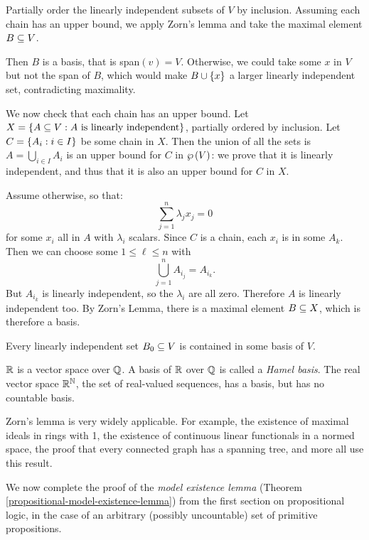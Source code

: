 \documentclass{article}
\begin{document}
\begin{prf}
    Partially order the linearly independent subsets of $V$ by inclusion. Assuming each chain has an upper bound, we apply Zorn's lemma and take the maximal element $B \subseteq V$.
    
    Then $B$ is a basis, that is span$(v) = V$. Otherwise, we could take some $x$ in $V$ but not the span of $B$, which would make $B \cup \left\lbrace x \right\rbrace$ a larger linearly independent set, contradicting maximality.
    
    We now check that each chain has an upper bound. Let $X = \left\lbrace A \subseteq V : A \text{ is linearly independent} \right\rbrace$, partially ordered by inclusion. Let $C = \left\lbrace A_i : i \in I \right\rbrace$ be some chain in $X$. Then the union of all the sets is $A = \bigcup_{i \in I} A_i$ is an upper bound for $C$ in $\wp\left(V\right)$: we prove that it is linearly independent, and thus that it is also an upper bound for $C$ in $X$.
    
    Assume otherwise, so that:
    \[
	\sum_{j=1}^n \lambda_j x_j = 0
	\]
	for some $x_i$ all in $A$ with $\lambda_i$ scalars. Since $C$ is a chain, each $x_i$ is in some $A_k$. Then we can choose some $1 \leq \ell \leq n$ with
	\[
	\bigcup_{j=1}^n A_{i_j} = A_{i_k}.
	\]
	But $A_{i_k}$ is linearly independent, so the $\lambda_i$ are all zero. Therefore $A$ is linearly independent too. By Zorn's Lemma, there is a maximal element $B \subseteq X$, which is therefore a basis.
\end{prf}

\begin{corollary}
	Every linearly independent set $B_0 \subseteq V$ is contained in some basis of $V$.
\end{corollary}

\begin{note}
	$\mathbb{R}$ is a vector space over $\mathbb{Q}$. A basis of $\mathbb{R}$ over $\mathbb{Q}$ is called a \textit{Hamel basis}. The real vector space $\mathbb{R}^{\mathbb{N}}$, the set of real-valued sequences, has a basis, but has no countable basis.
\end{note}

\begin{note}
	Zorn's lemma is very widely applicable. For example, the existence of maximal ideals in rings with 1, the existence of continuous linear functionals in a normed space, the proof that every connected graph has a spanning tree, and more all use this result.
\end{note}

We now complete the proof of the \textit{model existence lemma} (Theorem \ref{propositional-model-existence-lemma}) from the first section on propositional logic, in the case of an arbitrary (possibly uncountable) set of primitive propositions.
\end{document}
